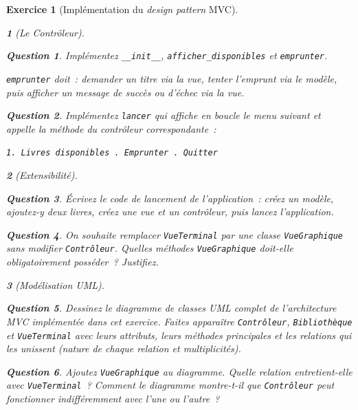 \documentclass{article}
\theoremstyle{exostyle}
\newtheorem{exo}{Exercice}
\theoremstyle{partiestyle}
\newtheorem{partie}{}[exo]
\theoremstyle{questionstyle}
\newtheorem{questionpartie}{Question}[partie]
\begin{document}
\begin{exo}[Implémentation du \textit{design pattern} MVC]
\begin{partie}[Le Contrôleur]
        \begin{questionpartie}
            Implémentez \texttt{\_\_init\_\_}, \texttt{afficher\_disponibles} et \texttt{emprunter}.

            \texttt{emprunter} doit~: demander un titre via la vue, tenter l'emprunt via le modèle, puis afficher un message de succès ou d'échec via la vue.
        \end{questionpartie}

        \begin{questionpartie}
            Implémentez \texttt{lancer} qui affiche en boucle le menu suivant et appelle la méthode du contrôleur correspondante~:
            \begin{center}
                \texttt{1. Livres disponibles . Emprunter . Quitter}
            \end{center}
        \end{questionpartie}

    \end{partie}

    \begin{partie}[Extensibilité]

        \begin{questionpartie}
            Écrivez le code de lancement de l'application~: créez un modèle, ajoutez-y deux livres, créez une vue et un contrôleur, puis lancez l'application.
        \end{questionpartie}

        \begin{questionpartie}
            On souhaite remplacer \texttt{VueTerminal} par une classe \texttt{VueGraphique} sans modifier \texttt{Contrôleur}. Quelles méthodes \texttt{VueGraphique} doit-elle obligatoirement posséder~? Justifiez.
        \end{questionpartie}

    \end{partie}

    \begin{partie}[Modélisation UML]

        \begin{questionpartie}
            Dessinez le diagramme de classes UML complet de l'architecture MVC implémentée dans cet exercice. Faites apparaître \texttt{Contrôleur}, \texttt{Bibliothèque} et \texttt{VueTerminal} avec leurs attributs, leurs méthodes principales et les relations qui les unissent (nature de chaque relation et multiplicités).
        \end{questionpartie}

        \begin{questionpartie}
            Ajoutez \texttt{VueGraphique} au diagramme. Quelle relation entretient-elle avec \texttt{VueTerminal}~? Comment le diagramme montre-t-il que \texttt{Contrôleur} peut fonctionner indifféremment avec l'une ou l'autre~?
        \end{questionpartie}

    \end{partie}
\end{exo}
\end{document}
